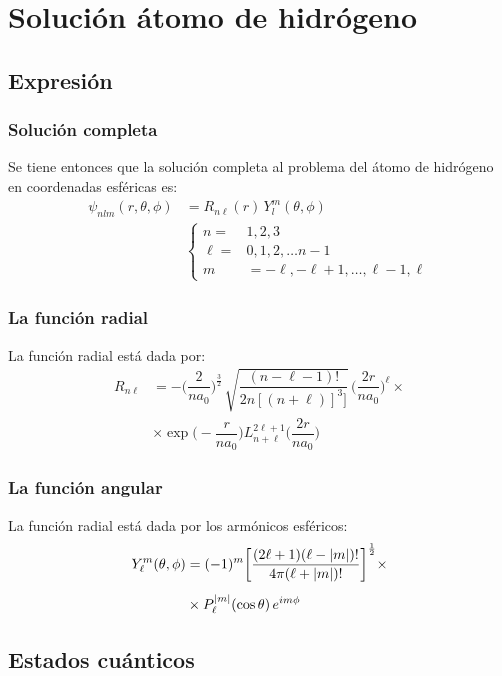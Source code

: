 \documentclass[12pt]{beamer}
\begin{document}
\section{Solución átomo de hidrógeno}
\subsection{Expresión}

\begin{frame}
\frametitle{Solución completa}
Se tiene entonces que la solución completa al problema del átomo de hidrógeno en coordenadas esféricas es:
\pause
\begin{align*}
\psi_{n l m} (r, \theta, \phi) &= R_{n \ell}(r) \, Y_{l}^{m} (\theta, \phi) \\[0.5em]
&\begin{cases}
n = & 1, 2, 3 \\
\ell = & 0, 1, 2, \ldots n-1 \\
m &= -\ell, -\ell + 1, \ldots, \ell -1, \ell
\end{cases}
\end{align*}
\end{frame}
\begin{frame}
\frametitle{La función radial}
La función radial está dada por:
\pause
\begin{align*}
R_{n \ell} &= - \bigg( \dfrac{2}{n a_{0}} \bigg)^{\frac{3}{2}} \, \sqrt{\dfrac{(n - \ell - 1)!}{2 n [(n + \ell)]^{3}]}} \, \bigg( \dfrac{2 r}{n a_{0}} \bigg)^{\ell} \times \\[0.5em]
&\times \exp\bigg( - \dfrac{r}{n a_{0}} \bigg) L_{n+\ell}^{2\ell+1} \bigg( \dfrac{2 r}{n a_{0}} \bigg)
\end{align*}
\end{frame}
\begin{frame}
\frametitle{La función angular}
La función radial está dada por los armónicos esféricos:
\pause
\begin{align*}
Y_{\ell}^{m} (\theta, \phi) &= (-1)^{m} \bigg[ \dfrac{(2 \ell + 1)(\ell - \abs{m})!}{4 \pi (\ell + \abs{m})!} \bigg]^{\frac{1}{2}} \times \\[0.5em]
&\times P_{\ell}^{\abs{m}} (\cos \theta) \, e^{i m \phi}
\end{align*}
\end{frame}

\subsection{Estados cuánticos}
\end{document}
